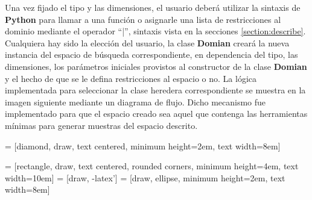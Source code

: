 Una vez fijado el tipo y las dimensiones, el usuario deberá utilizar la sintaxis de {\bf Python} para llamar a una función
o asignarle una lista de restricciones al dominio mediante el operador ``|'', sintaxis vista en la secciones \ref{section:describe}.
Cualquiera hay sido la elección del usuario, la clase  {\bf Domian}  creará la nueva instancia del espacio de
búsqueda correspondiente, en dependencia del tipo, las dimensiones, los parámetros iniciales provistos al constructor
de la clase  {\bf Domian}  y el hecho de que se le defina restricciones al espacio o no. La lógica implementada para seleccionar
la clase heredera correspondiente se muestra en la imagen siguiente mediante un diagrama de flujo. Dicho mecanismo fue
implementado para que el espacio creado sea aquel que contenga las herramientas mínimas para generar muestras del
espacio descrito.
\newline
\newline



 = [diamond, draw, text centered, minimum height=2em, text width=8em]


 = [rectangle, draw, text centered, rounded corners, minimum height=4em, text width=10em]
 = [draw, -latex']
 = [draw, ellipse, minimum height=2em, text width=8em]


